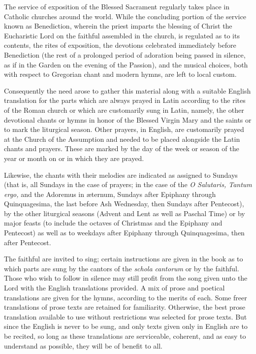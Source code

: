 
{\par}


\begin{enpars}
The service of exposition of the Blessed Sacrament regularly takes place in Catholic churches around the world. While the concluding portion of the service known as Benediction, wherein the priest imparts the blessing of Christ the Eucharistic Lord on the faithful assembled in the church, is regulated as to its contents, the rites of exposition, the devotions celebrated immediately before Benediction (the rest of a prolonged period of adoration being passed in silence, as if in the Garden on the evening of the Passion), and the musical choices, both with respect to Gregorian chant and modern hymns, are left to local custom.

Consequently the need arose to gather this material along with a suitable English translation for the parts which are always prayed in Latin according to the rites of the Roman church or which are customarily sung in Latin, namely, the other devotional chants or hymns in honor of the Blessed Virgin Mary and the saints or to mark the liturgical season. Other prayers, in English, are customarily prayed at the Church of the Assumption and needed to be placed alongside the Latin chants and prayers. These are marked by the day of the week or season of the year or month on or in which they are prayed.

Likewise, the chants with their melodies are indicated as assigned to Sundays (that is, all Sundays in the case of prayers; in the case of the \textit{O Salutaris, Tantum ergo,} and the {Adoremus in æternum,} Sundays after Epiphany through Quinquagesima, the last before Ash Wednesday, then Sundays after Pentecost), by the other liturgical seasons (Advent and Lent as well as Paschal Time) or by major feasts (to include the octaves of Christmas and the Epiphany and Pentecost) as well as to weekdays after Epiphany through Quinquagesima, then after Pentecost.

The faithful are invited to sing; certain instructions are given in the book as to which parts are sung by the cantors of the \textit{schola cantorum} or by the faithful. Those who wish to follow in silence may still profit from the song given unto the Lord with the English translations provided. A mix of prose and poetical translations are given for the hymns, according to the merits of each. Some freer translations of prose texts are retained for familiarity. Otherwise, the best prose translation available to use without restrictions was selected for prose texts. But since the English is never to be sung, and only texts given only in English are to be recited, so long as these translations are serviceable, coherent, and as easy to understand as possible, they will be of benefit to all.


\end{enpars}
